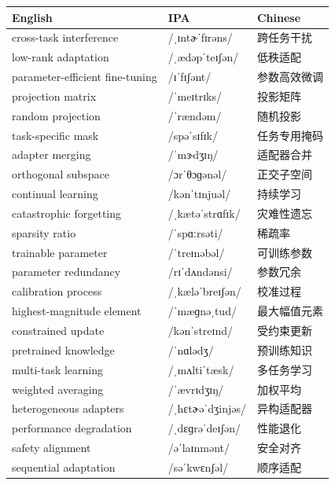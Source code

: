 \documentclass[UTF8,12pt,a4paper]{ctexart}
\providecommand{\zh}[1]{#1}
\begin{document}
\begin{tabular*}{\textwidth}{@{\extracolsep{\fill}}lll@{}}
\toprule
\textbf{English} & \textbf{IPA} & \textbf{Chinese} \\
\midrule
cross-task interference & {\ipafont /ˌɪntɚˈfɪrəns/} & \zh{跨任务干扰} \\
low-rank adaptation & {\ipafont /ˌædəpˈteɪʃən/} & \zh{低秩适配} \\
parameter-efficient fine-tuning & {\ipafont /ɪˈfɪʃənt/} & \zh{参数高效微调} \\
projection matrix & {\ipafont /ˈmeɪtrɪks/} & \zh{投影矩阵} \\
random projection & {\ipafont /ˈrændəm/} & \zh{随机投影} \\
task-specific mask & {\ipafont /spəˈsɪfɪk/} & \zh{任务专用掩码} \\
adapter merging & {\ipafont /ˈmɝdʒɪŋ/} & \zh{适配器合并} \\
orthogonal subspace & {\ipafont /ɔrˈθɔɡənəl/} & \zh{正交子空间} \\
continual learning & {\ipafont /kənˈtɪnjuəl/} & \zh{持续学习} \\
catastrophic forgetting & {\ipafont /ˌkætəˈstrɑfɪk/} & \zh{灾难性遗忘} \\
sparsity ratio & {\ipafont /ˈspɑːrsəti/} & \zh{稀疏率} \\
trainable parameter & {\ipafont /ˈtreɪnəbəl/} & \zh{可训练参数} \\
parameter redundancy & {\ipafont /rɪˈdʌndənsi/} & \zh{参数冗余} \\
calibration process & {\ipafont /ˌkæləˈbreɪʃən/} & \zh{校准过程} \\
highest-magnitude element & {\ipafont /ˈmæɡnəˌtud/} & \zh{最大幅值元素} \\
constrained update & {\ipafont /kənˈstreɪnd/} & \zh{受约束更新} \\
pretrained knowledge & {\ipafont /ˈnɑlədʒ/} & \zh{预训练知识} \\
multi-task learning & {\ipafont /ˌmʌltiˈtæsk/} & \zh{多任务学习} \\
weighted averaging & {\ipafont /ˈævrɪdʒɪŋ/} & \zh{加权平均} \\
heterogeneous adapters & {\ipafont /ˌhɛtɚəˈdʒinjəs/} & \zh{异构适配器} \\
performance degradation & {\ipafont /ˌdɛɡrəˈdeɪʃən/} & \zh{性能退化} \\
safety alignment & {\ipafont /əˈlaɪnmənt/} & \zh{安全对齐} \\
sequential adaptation & {\ipafont /səˈkwɛnʃəl/} & \zh{顺序适配} \\

\end{tabular*}
\end{document}
